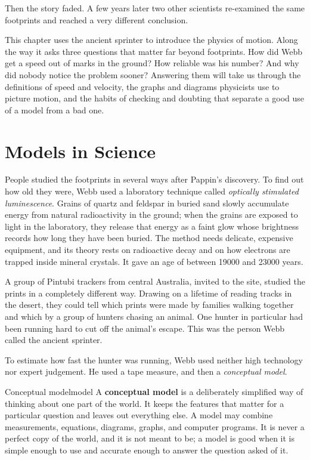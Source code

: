 \documentclass[11pt,twoside,openany]{book}
\newcounter{check}[chapter]
\begin{document}
Then the story faded. A few years later two other scientists re-examined the same footprints and reached a very different conclusion.

This chapter uses the ancient sprinter to introduce the physics of motion. Along the way it asks three questions that matter far beyond footprints. How did Webb get a speed out of marks in the ground? How reliable was his number? And why did nobody notice the problem sooner? Answering them will take us through the definitions of speed and velocity, the graphs and diagrams physicists use to picture motion, and the habits of checking and doubting that separate a good use of a model from a bad one.

\section{Models in Science}

People studied the footprints in several ways after Pappin's discovery. To find out how old they were, Webb used a laboratory technique called \emph{optically stimulated luminescence}. Grains of quartz and feldspar in buried sand slowly accumulate energy from natural radioactivity in the ground; when the grains are exposed to light in the laboratory, they release that energy as a faint glow whose brightness records how long they have been buried. The method needs delicate, expensive equipment, and its theory rests on radioactive decay and on how electrons are trapped inside mineral crystals. It gave an age of between \num{19000} and \num{23000} years.

A group of Pintubi trackers from central Australia, invited to the site, studied the prints in a completely different way. Drawing on a lifetime of reading tracks in the desert, they could tell which prints were made by families walking together and which by a group of hunters chasing an animal. One hunter in particular had been running hard to cut off the animal's escape. This was the person Webb called the ancient sprinter.

To estimate how fast the hunter was running, Webb used neither high technology nor expert judgement. He used a tape measure, and then a \emph{conceptual model}.

\begin{definition}{Conceptual model}{model}
A \textbf{conceptual model} is a deliberately simplified way of thinking about one part of the world. It keeps the features that matter for a particular question and leaves out everything else. A model may combine measurements, equations, diagrams, graphs, and computer programs. It is never a perfect copy of the world, and it is not meant to be; a model is good when it is simple enough to use and accurate enough to answer the question asked of it.
\end{definition}
\end{document}
